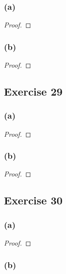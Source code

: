 \documentclass[14pt]{extarticle}
\begin{document}
\subsubsection{(a)}

\begin{proof}

\end{proof}

\subsubsection{(b)}

\begin{proof}

\end{proof}

\subsection{Exercise 29}

\subsubsection{(a)}

\begin{proof}

\end{proof}

\subsubsection{(b)}

\begin{proof}

\end{proof}

\subsection{Exercise 30}

\subsubsection{(a)}

\begin{proof}

\end{proof}

\subsubsection{(b)}
\end{document}

